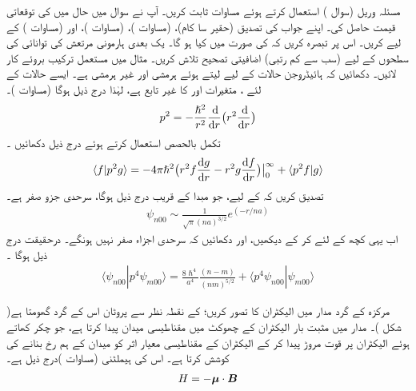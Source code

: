   
مسئلہ وریل (سوال )  استعمال کرتے ہوئے مساوات    ثابت کریں۔ 
آپ نے سوال    میں حال  میں   کی توقعاتی قیمت حاصل کی۔ اپنے جواب کی تصدیق  (حقیر  سا کام)،   (مساوات )،   (مساوات )،   اور  (مساوات ) کے لیے کریں۔ اس پر تبصرہ کریں کہ   کی صورت میں کیا ہو گا۔
 یک بعدی ہارمونی مرتعش کی توانائی کی سطحوں کے لیے (سب سے کم رتبی)  اضافیتی تصحیح تلاش کریں۔  مثال    میں مستعمل ترکیب بروئے کار لائیں۔ 
دکھائیں کہ ہائیڈروجن حالات کے لیے  لیتے ہوئے  ہرمشی  اور   غیر ہرمشی  ہے۔  ایسے  حالات کے لئے ،  متغیرات  اور  کا غیر تابع ہے،   لہٰذا   درج ذیل ہوگا  (مساوات )۔
\begin{align*}
p^2 = - \frac{\hslash^2}{r^2} \frac{\dif }{\dif r} \big ( r^2 \frac{\dif}{\dif r} \big )
\end{align*}
تکمل بالحصص استعمال کرتے ہوئے درج ذیل دکھائیں ۔
\begin{align*}
\langle f | p^2 g \rangle = - 4 \pi \hslash^2 
\big ( r^2 f \frac{\dif g}{\dif r} - r^2 g \frac{\dif f}{\dif r} \big ) \big \rvert_0^{\infty} + \langle p^2 f | g \rangle 
\end{align*}
تصدیق کریں  کہ  کے لیے، جو مبدا کے قریب درج ذیل ہوگا، سرحدی جزو صفر ہے۔
\begin{align*}
\psi_{n00} \sim \frac{1}{\sqrt{\pi} (na)^{3/2}} e^{(-r/na)}
\end{align*}
اب یہی کچھ  کے لئے کر کے دیکھیں،  اور دکھائیں  کہ سرحدی اجزاء صفر نہیں ہونگے۔  درحقیقت درج ذیل ہوگا ۔
\begin{align*}
\langle \psi_{n00} | p^4 \psi_{m00} \rangle = \frac{8\hslash^4}{a^4} \frac{(n - m)}{(nm)^{5/2}} + \langle p^4 \psi_{n00} | \psi_{m00} \rangle
\end{align*}


مرکزہ کے گرد مدار میں الیکٹران کا تصور کریں؛    کے نقطہ نظر سے پروٹان اس کے گرد گھومتا ہے( شکل )۔   مدار میں مثبت بار الیکٹران کے چھوکٹ میں مقناطیسی میدان    پیدا کرتا ہے،  جو چکر کھاتے ہوئے الیکٹران پر  قوت مروڑ   پیدا کر کے الیکٹران کے مقناطیسی معیار اثر  کو میدان کے ہم رخ بنانے کی کوشش کرتا ہے۔  اس کی ہیملٹنی (مساوات )درج ذیل ہے۔
\begin{align}\label{مساوات_غیر_مضطرب_مقناطیسی_میدان_میں_ہیملٹنی}
H = - {{\boldsymbol{\mu}}} \cdot {\ensuremath{{\boldsymbol{B}}}}
\end{align}

